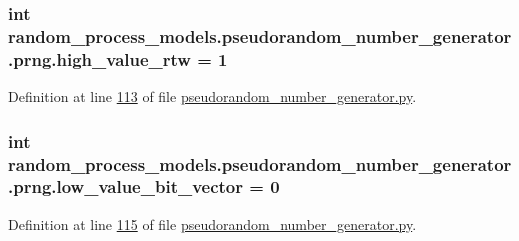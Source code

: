 \subsubsection[{high\+\_\+value\+\_\+rtw}]{\setlength{\rightskip}{0pt plus 5cm}int random\+\_\+process\+\_\+models.\+pseudorandom\+\_\+number\+\_\+generator.\+prng.\+high\+\_\+value\+\_\+rtw = 1\hspace{0.3cm}{\ttfamily [static]}}\label{classrandom__process__models_1_1pseudorandom__number__generator_1_1prng_af12063b0aa05ec3b1cb998eb59af1b39}


Definition at line \hyperlink{pseudorandom__number__generator_8py_source_l00113}{113} of file \hyperlink{pseudorandom__number__generator_8py_source}{pseudorandom\+\_\+number\+\_\+generator.\+py}.

\hypertarget{classrandom__process__models_1_1pseudorandom__number__generator_1_1prng_a74806f6f1dfe673c2132e8c4ec4f0ac2}{}
\subsubsection[{low\+\_\+value\+\_\+bit\+\_\+vector}]{\setlength{\rightskip}{0pt plus 5cm}int random\+\_\+process\+\_\+models.\+pseudorandom\+\_\+number\+\_\+generator.\+prng.\+low\+\_\+value\+\_\+bit\+\_\+vector = 0\hspace{0.3cm}{\ttfamily [static]}}\label{classrandom__process__models_1_1pseudorandom__number__generator_1_1prng_a74806f6f1dfe673c2132e8c4ec4f0ac2}


Definition at line \hyperlink{pseudorandom__number__generator_8py_source_l00115}{115} of file \hyperlink{pseudorandom__number__generator_8py_source}{pseudorandom\+\_\+number\+\_\+generator.\+py}.

\hypertarget{classrandom__process__models_1_1pseudorandom__number__generator_1_1prng_adf3f03d77c73d020e031922b1e8ef1b4}{}
